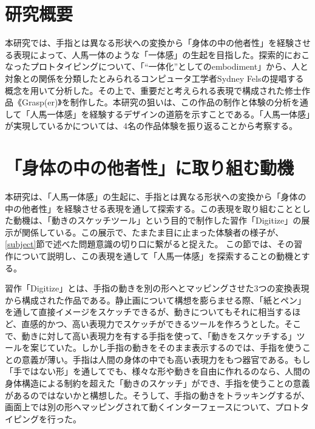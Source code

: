 

\section{研究概要}
本研究では、手指とは異なる形状への変換から「身体の中の他者性」を経験させる表現によって、人馬一体のような「一体感」の生起を目指した。探索的におこなったプロトタイピングについて、「``一体化''としてのembodiment」から、人と対象との関係を分類したとみられるコンピュータ工学者Sydney Felsの提唱する概念を用いて分析した。その上で、重要だと考えられる表現で構成された修士作品《Grasp(er)》を制作した。本研究の狙いは、この作品の制作と体験の分析を通して「人馬一体感」を経験するデザインの道筋を示すことである。「人馬一体感」が実現しているかについては、4名の作品体験を振り返ることから考察する。

\section{「身体の中の他者性」に取り組む動機}
\label{prototyping_concept_making}
本研究は、「人馬一体感」の生起に、手指とは異なる形状への変換から「身体の中の他者性」を経験させる表現を通して探索する。この表現を取り組むこととした動機は、「動きのスケッチツール」という目的で制作した習作「Digitize」の展示が関係している。この展示で、たまたま目に止まった体験者の様子が、 \ref{subject}節で述べた問題意識の切り口に繋がると捉えた。
この節では、その習作について説明し、この表現を通して「人馬一体感」を探索することの動機とする。

習作「Digitize」とは、手指の動きを別の形へとマッピングさせた3つの変換表現から構成された作品である。静止画について構想を膨らませる際、「紙とペン」を通して直接イメージをスケッチできるが、動きについてもそれに相当するほど、直感的かつ、高い表現力でスケッチができるツールを作ろうとした。そこで、動きに対して高い表現力を有する手指を使って、「動きをスケッチする」ツールを案じていた。しかし手指の動きをそのまま表示するのでは、手指を使うことの意義が薄い。手指は人間の身体の中でも高い表現力をもつ器官である。もし「手ではない形」を通してでも、様々な形や動きを自由に作れるのなら、人間の身体構造による制約を超えた「動きのスケッチ」ができ、手指を使うことの意義があるのではないかと構想した。そうして、手指の動きをトラッキングするが、画面上では別の形へマッピングされて動くインターフェースについて、プロトタイピングを行った。

